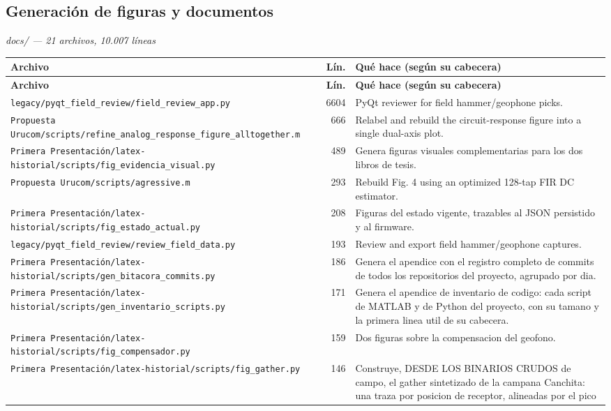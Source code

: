 \subsection{Generaci\'on de figuras y documentos}
\textit{\small docs/ --- 21 archivos, 10.007 l\'ineas}
\footnotesize
\begin{longtable}{@{}p{5.4cm} r p{8.6cm}@{}}
\toprule \textbf{Archivo} & \textbf{L\'in.} & \textbf{Qu\'e hace (seg\'un su cabecera)} \\ \midrule
\endfirsthead
\toprule \textbf{Archivo} & \textbf{L\'in.} & \textbf{Qu\'e hace (seg\'un su cabecera)} \\ \midrule
\endhead
\bottomrule \endfoot
\texttt{\scriptsize legacy/pyqt\_field\_review/field\_review\_app.py} & 6604 & PyQt reviewer for field hammer/geophone picks. \\
\texttt{\scriptsize Propuesta Urucom/scripts/refine\_analog\_response\_figure\_alltogether.m} & 666 & Relabel and rebuild the circuit-response figure into a single dual-axis plot. \\
\texttt{\scriptsize Primera Presentación/latex-historial/scripts/fig\_evidencia\_visual.py} & 489 & Genera figuras visuales complementarias para los dos libros de tesis. \\
\texttt{\scriptsize Propuesta Urucom/scripts/agressive.m} & 293 & Rebuild Fig. 4 using an optimized 128-tap FIR DC estimator. \\
\texttt{\scriptsize Primera Presentación/latex-historial/scripts/fig\_estado\_actual.py} & 208 & Figuras del estado vigente, trazables al JSON persistido y al firmware. \\
\texttt{\scriptsize legacy/pyqt\_field\_review/review\_field\_data.py} & 193 & Review and export field hammer/geophone captures. \\
\texttt{\scriptsize Primera Presentación/latex-historial/scripts/gen\_bitacora\_commits.py} & 186 & Genera el apendice con el registro completo de commits de todos los repositorios del proyecto, agrupado por dia. \\
\texttt{\scriptsize Primera Presentación/latex-historial/scripts/gen\_inventario\_scripts.py} & 171 & Genera el apendice de inventario de codigo: cada script de MATLAB y de Python del proyecto, con su tamano y la primera linea util de su cabecera. \\
\texttt{\scriptsize Primera Presentación/latex-historial/scripts/fig\_compensador.py} & 159 & Dos figuras sobre la compensacion del geofono. \\
\texttt{\scriptsize Primera Presentación/latex-historial/scripts/fig\_gather.py} & 146 & Construye, DESDE LOS BINARIOS CRUDOS de campo, el gather sintetizado de la campana Canchita: una traza por posicion de receptor, alineadas por el pico \\

\end{longtable}
